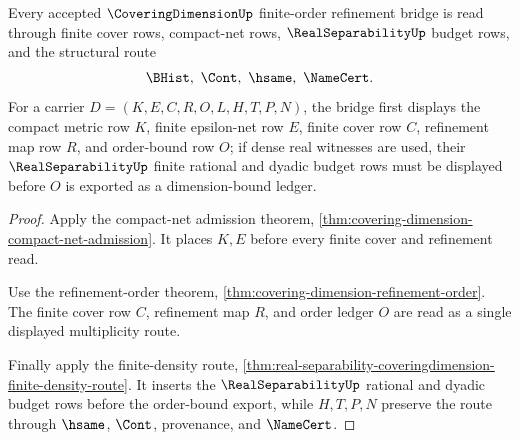 \begin{theorem}
\label{thm:coveringdimension-finite-order-refinement-bridge}
Every accepted $\CoveringDimensionUp$ finite-order refinement bridge is read through finite cover rows, compact-net rows, $\RealSeparabilityUp$ budget rows, and the structural route
$$
\BHist,\ \Cont,\ \hsame,\ \NameCert .
$$
For a carrier $D=(K,E,C,R,O,L,H,T,P,N)$, the bridge first displays the compact metric row $K$, finite epsilon-net row $E$, finite cover row $C$, refinement map row $R$, and order-bound row $O$; if dense real witnesses are used, their $\RealSeparabilityUp$ finite rational and dyadic budget rows must be displayed before $O$ is exported as a dimension-bound ledger.
\end{theorem}
\begin{proof}
Apply the compact-net admission theorem, \autoref{thm:covering-dimension-compact-net-admission}. It places $K,E$ before every finite cover and refinement read.

Use the refinement-order theorem, \autoref{thm:covering-dimension-refinement-order}. The finite cover row $C$, refinement map $R$, and order ledger $O$ are read as a single displayed multiplicity route.

Finally apply the finite-density route, \autoref{thm:real-separability-coveringdimension-finite-density-route}. It inserts the $\RealSeparabilityUp$ rational and dyadic budget rows before the order-bound export, while $H,T,P,N$ preserve the route through $\hsame$, $\Cont$, provenance, and $\NameCert$.
\end{proof}

